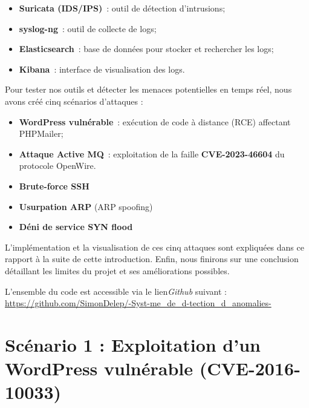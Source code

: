 \documentclass[12pt]{article}
\begin{document}
\begin{itemize}[nosep]
  \item \textbf{Suricata (IDS/IPS)}~: outil de détection d'intrusions;
  \item \textbf{syslog-ng}~: outil de collecte de logs;
  \item \textbf{Elasticsearch}~: base de données pour stocker et rechercher les logs;
  \item \textbf{Kibana}~: interface de visualisation des logs.
\end{itemize}

\vspace{0.4cm}

Pour tester nos outils et détecter les menaces potentielles en temps réel, nous avons créé cinq scénarios d'attaques :

\begin{itemize}[nosep]
  \item \textbf{WordPress vulnérable}~: exécution de code à distance (RCE) affectant PHPMailer;
  \item \textbf{Attaque Active MQ}~: exploitation de la faille \textbf{CVE-2023-46604} du protocole OpenWire. 
  \item \textbf{Brute-force SSH}
  \item \textbf{Usurpation ARP} (ARP spoofing)
  \item \textbf{Déni de service SYN flood}
\end{itemize}

\vspace{0.4cm}

L'implémentation et la visualisation de ces cinq attaques sont expliquées dans ce rapport à la suite de cette introduction. Enfin, nous finirons sur une conclusion détaillant les limites du projet et ses améliorations possibles.

\vspace{0.4cm}

L'ensemble du code est accessible via le lien\textit{Github} suivant : \newline
\url{https://github.com/SimonDelep/-Syst-me_de_d-tection_d_anomalies-} \newline


\section{Scénario 1 : Exploitation d'un WordPress vulnérable (CVE-2016-10033)}\label{sec:Q3} 
\end{document}
